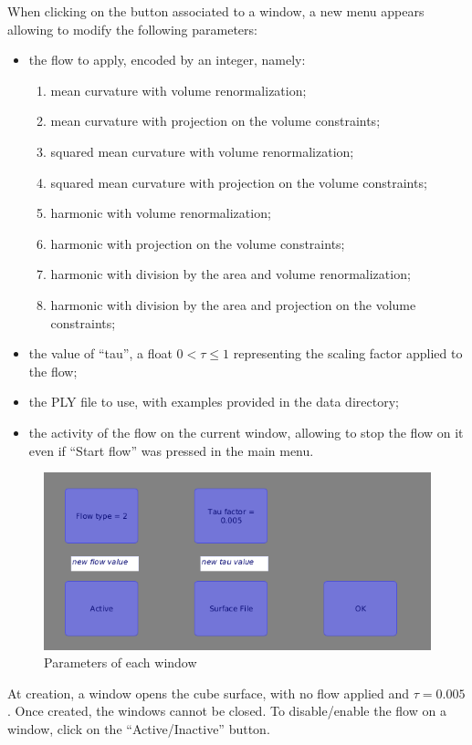 \documentclass{article}
\begin{document}
When clicking on the button associated to a window, a new menu appears
allowing to modify the following parameters:
\begin{itemize}
  \item the flow to apply, encoded by an integer, namely:
  \begin{enumerate}
    \item mean curvature with volume renormalization;
    \item mean curvature with projection on the volume constraints;
    \item squared mean curvature with volume renormalization;
    \item squared mean curvature with projection on the volume constraints;
    \item harmonic with volume renormalization;
    \item harmonic with projection on the volume constraints;
    \item harmonic with division by the area and volume renormalization;
    \item harmonic with division by the area and projection on the volume constraints;
  \end{enumerate}
  \item the value of ``tau'', a float $0 < \tau \leq 1$ representing the scaling factor applied to the flow;
  \item the PLY file to use, with examples provided in the data directory;
  \item the activity of the flow on the current window,
    allowing to stop the flow on it even if ``Start flow'' was pressed in the main menu.
\end{itemize}

\begin{figure}[h]
  \begin{center}
    \includegraphics[width=.5\textwidth]{img/win_params.png}
    \caption{Parameters of each window}
    \label{fig:win_params}
  \end{center}
\end{figure}

At creation, a window opens the cube surface, with no flow applied and $\tau = 0.005$.
Once created, the windows cannot be closed. To disable/enable the flow on a window,
click on the ``Active/Inactive'' button.
\end{document}
